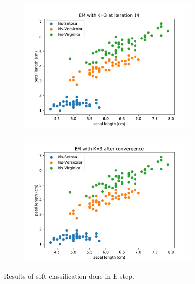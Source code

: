 \documentclass{article}
\begin{document}
\begin{figure}[!ht]
{\begin{subfigure}{0.6\textwidth}
	\includegraphics[width=\textwidth]{./Figures/2_1_EM_iter14}
	\end{subfigure}
	\begin{subfigure}{0.6\textwidth}
	\includegraphics[width=\textwidth]{./Figures/2_1_EM_converged}
	\end{subfigure}
	}	
	\caption{Results of soft-classification done in E-step.}
	\label{2_1_EM_iter}
\end{figure}
\end{document}
